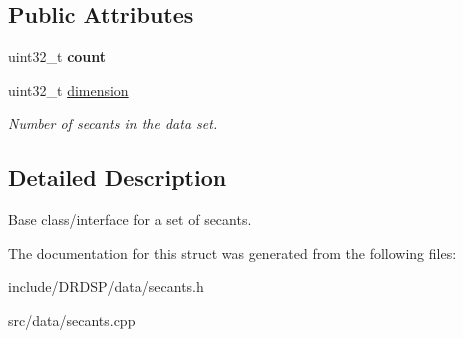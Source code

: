 \subsection*{Public Attributes}
\begin{DoxyCompactItemize}
\item 
\hypertarget{struct_d_r_d_s_p_1_1_secants_a0c6a707afa517ee01f1a2a76e1ed76bf}{uint32\-\_\-t {\bfseries count}}\label{struct_d_r_d_s_p_1_1_secants_a0c6a707afa517ee01f1a2a76e1ed76bf}

\item 
\hypertarget{struct_d_r_d_s_p_1_1_secants_a950d625f7d298f93eaad20062f79db1b}{uint32\-\_\-t \hyperlink{struct_d_r_d_s_p_1_1_secants_a950d625f7d298f93eaad20062f79db1b}{dimension}}\label{struct_d_r_d_s_p_1_1_secants_a950d625f7d298f93eaad20062f79db1b}

\begin{DoxyCompactList}\small\item\em Number of secants in the data set. \end{DoxyCompactList}\end{DoxyCompactItemize}


\subsection{Detailed Description}
Base class/interface for a set of secants. 

The documentation for this struct was generated from the following files\-:\begin{DoxyCompactItemize}
\item 
include/\-D\-R\-D\-S\-P/data/secants.\-h\item 
src/data/secants.\-cpp\end{DoxyCompactItemize}

